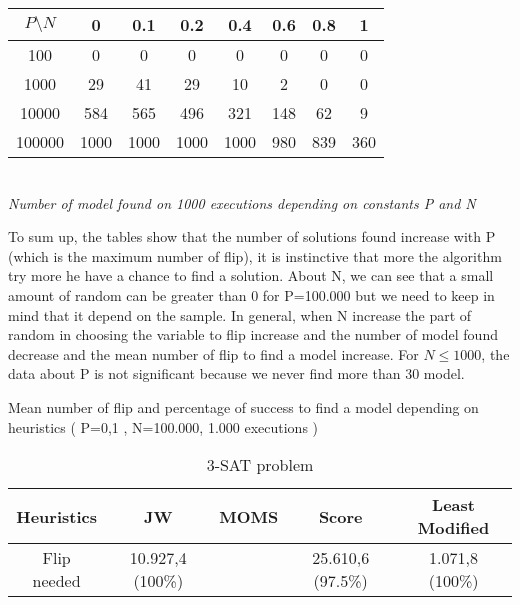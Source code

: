 \documentclass[a4paper]{article}
\begin{document}
\begin{table}[h!]
\begin{center}
\begin{tabular}{c||c c c c c c c}
         	$P \setminus N$ & 0  & 0.1  & 0.2  & 0.4  & 0.6 & 0.8 & 1  \\
        	\hline
        	\hline
     	    100 &  0   &   0   & 0     &  0   &  0  & 0   & 0  \\
     	   1000 & 29   &  41   & 29    & 10   & 2   & 0   & 0  \\
    	  10000 & 584  & 565   & 496   & 321  & 148 & 62  & 9  \\
    	 100000 & 1000 & 1000  & 1000  & 1000 & 980 & 839 & 360  \\
      	\end{tabular}\\
      	\textit{Number of model found on 1000 executions depending on constants P and N}
\end{center}
\end{table}
\newpage
To sum up, the tables show that the number of solutions found increase with P (which is the maximum number of flip), it is instinctive that more the algorithm try more he have a chance to find a solution. About N, we can see that a small amount of random can be greater than 0 for P=100.000 but we need to keep in mind that it depend on the sample. In general, when N increase the part of random in choosing the variable to flip increase and the number of model found decrease and the mean number of flip to find a model increase. For $ N \leq 1000 $, the data about P is  not significant because we never find more than 30 model.

\begin{center}
Mean number of flip and percentage of success to find a model depending on heuristics ( P=0,1 , N=100.000, 1.000 executions )
\end{center}

\begin{table}[h!]
\begin{center}
\begin{tabular}{c||c c c c}
         Heuristics & JW  & MOMS  & Score  & Least Modified  \\
        \hline
        \hline
         Flip needed & 10.927,4 (100\%)  & \cellcolor[gray]{0.5} & 25.610,6 (97.5\%) & 1.071,8 (100\%)\\

\end{tabular}
\caption{3-SAT problem}
\end{center}
\end{table}
\end{document}
